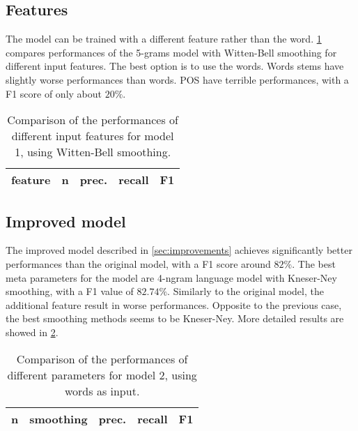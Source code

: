 \subsection{Features}
The model can be trained with a different feature rather than the word.
\cref{tab:v1-features} compares performances of the 5-grams model with Witten-Bell smoothing for different input features.
The best option is to use the words.
Words stems have slightly worse performances than words.
\ac{POS} have terrible performances, with a F1 score of only about $20\%$.

\begin{table}
	\centering
    \begin{tabular}{ l l l l l }
    	\toprule
    		feature & n & prec. & recall & F1 \\
    	\midrule
            
    	\bottomrule
	\end{tabular}
    \caption{Comparison of the performances of different input features for model 1, using Witten-Bell smoothing.}
	\label{tab:v1-features}
\end{table}

\subsection{Improved model}
The improved model described in \cref{sec:improvements} achieves significantly better performances than the original model, with a F1 score around $82\%$.
The best meta parameters for the model are 4-ngram language model with Kneser-Ney smoothing, with a F1 value of $82.74\%$.
Similarly to the original model, the additional feature result in worse performances.
Opposite to the previous case, the best smoothing methods seems to be Kneser-Ney.
More detailed results are showed in \cref{tab:v2}.

\begin{table}
	\centering
    \begin{tabular}{ l l l l l }
    	\toprule
    		n & smoothing & prec. & recall & F1 \\
    	\midrule
            
    	\bottomrule
	\end{tabular}
    \caption{Comparison of the performances of different parameters for model 2, using words as input.}
	\label{tab:v2}
\end{table}
